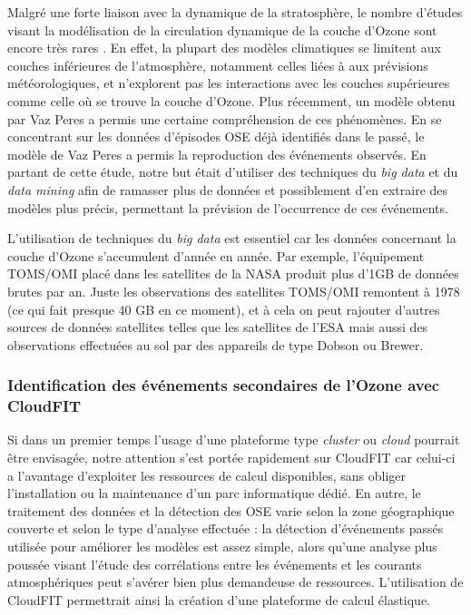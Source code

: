 Malgré une forte liaison avec la dynamique de la stratosphère, le nombre d'études visant la modélisation de la circulation dynamique de la couche d'Ozone sont encore très rares \cite{Marchand2005}. En effet, la plupart des modèles climatiques se limitent aux couches inférieures de l'atmosphère, notamment celles liées à aux prévisions météorologiques, et n'explorent pas les interactions avec les couches supérieures comme celle où se trouve la couche d'Ozone. Plus récemment, un modèle obtenu par Vaz Peres \cite{Peres2013} a permis une certaine compréhension de ces phénomènes. En se concentrant sur les données d'épisodes OSE déjà identifiés dans le passé, le modèle de Vaz Peres a permis la reproduction des événements observés. En partant de cette étude, notre but était d'utiliser des techniques du \textit{big data} et du \textit{data mining} afin de ramasser plus de données et possiblement d'en extraire des modèles plus précis, permettant la prévision de l'occurrence de ces événements.

L'utilisation de techniques du \textit{big data} est essentiel car les données concernant la couche d'Ozone s'accumulent d'année en année. Par exemple, l'équipement TOMS/OMI placé dans les satellites de la NASA produit plus d'1GB de données brutes par an. Juste les observations des satellites TOMS/OMI remontent à 1978 (ce qui fait presque 40 GB en ce moment), et à cela on peut rajouter d'autres sources de données satellites telles que les satellites de l'ESA mais aussi des observations effectuées au sol par des appareils de type Dobson ou Brewer. 

\subsubsection{Identification des événements secondaires de l'Ozone avec CloudFIT\label{sec:development}}

Si dans un premier temps l'usage d'une plateforme type \textit{cluster} ou \textit{cloud} pourrait être envisagée, notre attention s'est portée rapidement sur CloudFIT car celui-ci a l'avantage d'exploiter les ressources de calcul disponibles, sans obliger l'installation ou la maintenance d'un parc informatique dédié. En autre, le traitement des données et la détection des OSE varie selon la zone géographique couverte et selon le type d'analyse effectuée : la détection d'événements passés utilisée pour améliorer les modèles est assez simple, alors qu'une analyse plus poussée visant l'étude des corrélations entre les événements et les courants atmosphériques peut s'avérer bien plus demandeuse de ressources. L'utilisation de CloudFIT permettrait ainsi la création d'une plateforme de calcul élastique.

